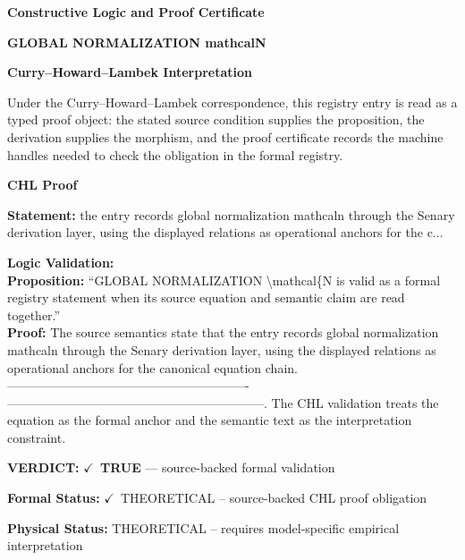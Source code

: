 \clearpage
\begingroup\tzpsupportsetup
\noindent\textbf{\fontsize{10.8pt}{12.8pt}\selectfont [ID 0573] Constructive Logic and Proof Certificate}\par
\noindent\textbf{\fontsize{10pt}{12pt}\selectfont GLOBAL NORMALIZATION mathcalN}\par
\vspace{0.45em}
\begingroup
\footnotesize
\setlength{\parskip}{0.22em}
\setlength{\parindent}{0pt}
\noindent\textbf{Curry--Howard--Lambek Interpretation}\par
Under the Curry--Howard--Lambek correspondence, this registry entry is read as a typed proof
object: the stated source condition supplies the proposition, the derivation supplies the
morphism, and the proof certificate records the machine handles needed to check the obligation
in the formal registry.

\vspace{0.45em}
\noindent\textbf{CHL Proof}\par
\textbf{Statement:} the entry records global normalization mathcaln through the Senary derivation layer,
using the displayed relations as operational anchors for the c...

\textbf{Logic Validation:}\\
\textbf{Proposition:} ``GLOBAL NORMALIZATION \textbackslash{}mathcal\{N is valid as a formal registry statement when its source
equation and semantic claim are read together.''\\
\textbf{Proof:} The source semantics state that the entry records global normalization mathcaln through
the Senary derivation layer, using the displayed relations as operational anchors for
the canonical equation chain. ----------------------------------------------------------
--------------------------------------------------------------. The CHL validation
treats the equation as the formal anchor and the semantic text as the interpretation
constraint.

\textbf{VERDICT:} \ensuremath{\checkmark}\ \textbf{TRUE} --- source-backed formal validation

\textbf{Formal Status:} \ensuremath{\checkmark}\ THEORETICAL -- source-backed CHL proof obligation

\textbf{Physical Status:} THEORETICAL -- requires model-specific empirical interpretation
\par\vspace{0.45em}
\par
\ifTZPDarkEdition
{}
\fi
\endgroup
\endgroup
